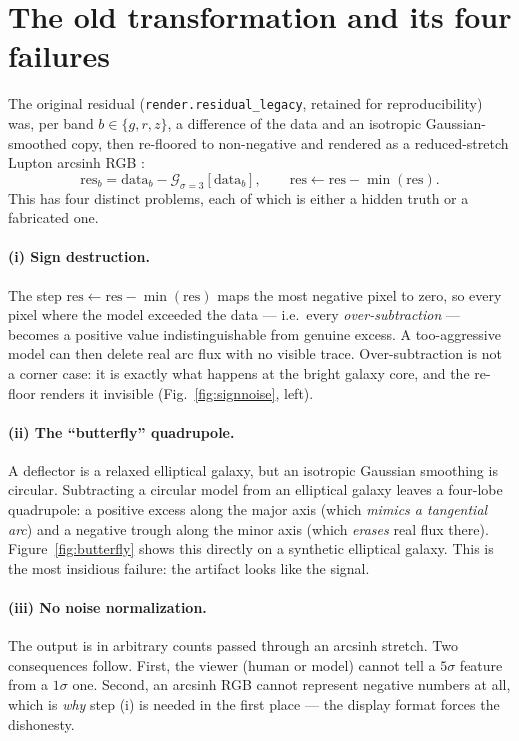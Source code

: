 \documentclass[11pt,letterpaper]{article}
\begin{document}
\section{The old transformation and its four failures}
\label{sec:old}
The original residual (\texttt{render.residual\_legacy}, retained for reproducibility) was, per band $b\in\{g,r,z\}$,
a difference of the data and an isotropic Gaussian-smoothed copy, then re-floored to non-negative and rendered as
a reduced-stretch Lupton arcsinh RGB \citep{lupton2004}:
\[
  \mathrm{res}_b = \mathrm{data}_b - \mathcal{G}_{\sigma=3}\!\left[\mathrm{data}_b\right],\qquad
  \mathrm{res} \leftarrow \mathrm{res} - \min(\mathrm{res}).
\]
This has four distinct problems, each of which is either a hidden truth or a fabricated one.

\paragraph{(i) Sign destruction.} The step $\mathrm{res}\leftarrow\mathrm{res}-\min(\mathrm{res})$ maps the most
negative pixel to zero, so every pixel where the model exceeded the data --- i.e.\ every \emph{over-subtraction}
--- becomes a positive value indistinguishable from genuine excess. A too-aggressive model can then delete real
arc flux with no visible trace. Over-subtraction is not a corner case: it is exactly what happens at the bright
galaxy core, and the re-floor renders it invisible (Fig.~\ref{fig:signnoise}, left).

\paragraph{(ii) The ``butterfly'' quadrupole.} A deflector is a relaxed elliptical galaxy, but an isotropic
Gaussian smoothing is circular. Subtracting a circular model from an elliptical galaxy leaves a four-lobe
quadrupole: a positive excess along the major axis (which \emph{mimics a tangential arc}) and a negative trough
along the minor axis (which \emph{erases} real flux there). Figure~\ref{fig:butterfly} shows this directly on a
synthetic elliptical galaxy. This is the most insidious failure: the artifact looks like the signal.

\paragraph{(iii) No noise normalization.} The output is in arbitrary counts passed through an arcsinh stretch.
Two consequences follow. First, the viewer (human or model) cannot tell a $5\sigma$ feature from a $1\sigma$ one.
Second, an arcsinh RGB cannot represent negative numbers at all, which is \emph{why} step (i) is needed in the
first place --- the display format forces the dishonesty.
\end{document}
